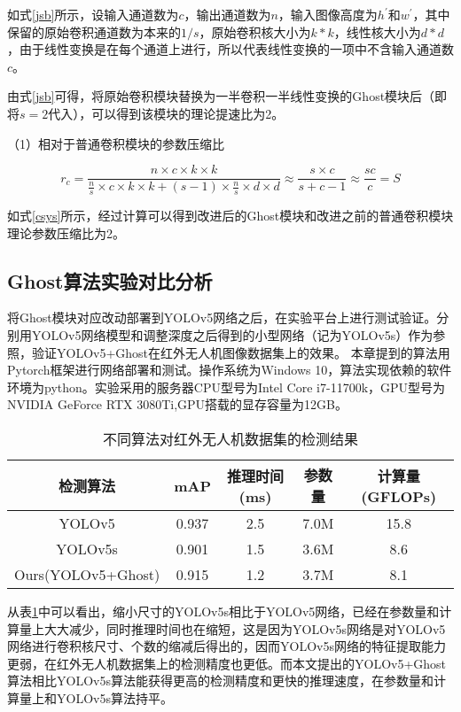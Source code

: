 如式\ref{jsb}所示，设输入通道数为$c$，输出通道数为$n$，输入图像高度为$h^{\prime}$和$w^{\prime}$，其中保留的原始卷积通道数为本来的$1/s$，原始卷积核大小为$k*k$，线性核大小为$d*d$，由于线性变换是在每个通道上进行，所以代表线性变换的一项中不含输入通道数$c$。

由式\ref{jsb}可得，将原始卷积模块替换为一半卷积一半线性变换的Ghost模块后（即将$s=2$代入），可以得到该模块的理论提速比为2。

（1）相对于普通卷积模块的参数压缩比

\begin{equation}
    r_{c}=\frac{n \times c \times k \times k}{\frac{n}{s} \times c \times k \times k+(s-1) \times \frac{n}{s} \times d \times d} \approx \frac{s \times c}{s+c-1} \approx \frac{s c}{c}=S
    \label{csys}
\end{equation}

如式\ref{csys}所示，经过计算可以得到改进后的Ghost模块和改进之前的普通卷积模块理论参数压缩比为2。

\subsection{Ghost算法实验对比分析}
将Ghost模块对应改动部署到YOLOv5网络之后，在实验平台上进行测试验证。分别用YOLOv5网络模型和调整深度之后得到的小型网络（记为YOLOv5s）作为参照，验证YOLOv5+Ghost在红外无人机图像数据集上的效果。
本章提到的算法用Pytorch框架进行网络部署和测试。操作系统为Windows 10，算法实现依赖的软件环境为python。实验采用的服务器CPU型号为Intel Core i7-11700k，GPU型号为NVIDIA GeForce RTX 3080Ti,GPU搭载的显存容量为12GB。

\begin{table}[htbp]
    \caption{不同算法对红外无人机数据集的检测结果}
    \vspace{0.5em}\centering\wuhao
    \begin{tabular}{ccccc}
    \toprule
    检测算法 & mAP & 推理时间(ms) & 参数量 & 计算量(GFLOPs)\\
    \midrule
    YOLOv5 & 0.937 & 2.5 & 7.0M & 15.8\\
    YOLOv5s & 0.901 & 1.5 & 3.6M & 8.6\\
    Ours(YOLOv5+Ghost)& 0.915 & 1.2 & 3.7M & 8.1\\
    \bottomrule
    \end{tabular}
    \label{t22}
\end{table}

从表\ref{t22}中可以看出，缩小尺寸的YOLOv5s相比于YOLOv5网络，已经在参数量和计算量上大大减少，同时推理时间也在缩短，这是因为YOLOv5s网络是对YOLOv5网络进行卷积核尺寸、个数的缩减后得出的，因而YOLOv5s网络的特征提取能力更弱，在红外无人机数据集上的检测精度也更低。而本文提出的YOLOv5+Ghost算法相比YOLOv5s算法能获得更高的检测精度和更快的推理速度，在参数量和计算量上和YOLOv5s算法持平。

